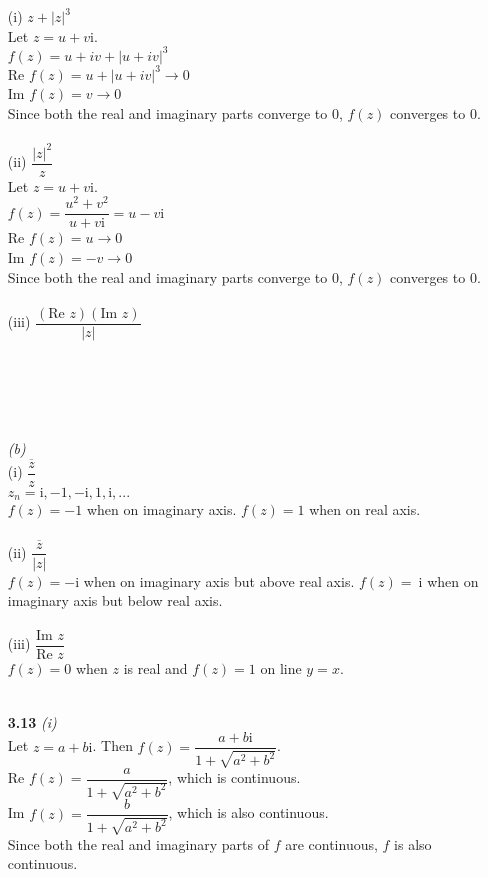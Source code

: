 \begin{enumerate}
(i) $z+|z|^3$ \\
Let $z = u+v\mathrm{i}$. \\
$f(z) = u+iv + |u+iv|^3$ \\
Re $f(z) = u+|u+iv|^3 \rightarrow0$ \\
Im $f(z) = v \rightarrow0$ \\
Since both the real and imaginary parts converge to 0, $f(z)$ converges to 0.
\\\\
(ii) $\dfrac{|z|^2}{z}$ \\
Let $z = u+v\mathrm{i}$. \\
$f(z) = \dfrac{u^2+v^2}{u+v\mathrm{i}} = u-v$i \\
Re $f(z) = u \rightarrow0$ \\
Im $f(z) = -v \rightarrow0$ \\
Since both the real and imaginary parts converge to 0, $f(z)$ converges to 0.
\\\\
(iii) $\dfrac{(\text{Re }z)(\text{Im }z)}{|z|}$ \\\\\\\\\\\\
\textit{(b)} \\
(i) $\dfrac{\overline{z}}{z}$ \\
$z_n = \mathrm{i}, -1, -\mathrm{i}, 1, \mathrm{i}, ...$ \\
$f(z) = -1$ when on imaginary axis.
$f(z) = 1$ when on real axis.
\\\\
(ii) $\dfrac{\overline{z}}{|z|}$ \\
$f(z) = -$i when on imaginary axis but above real axis.
$f(z) = \:$i when on imaginary axis but below real axis.
\\\\
(iii) $\dfrac{\text{Im }z}{\text{Re }z}$ \\
$f(z) = 0$ when $z$ is real and $f(z) = 1$ on line $y=x$.
\\\\
\item[\textbf{3.13}]
\textit{(i)} \\
Let $z = a+b\mathrm{i}$. Then $f(z) = 
\dfrac{a+b\mathrm{i}}{1+\sqrt{a^2+b^2}}$.\\
Re $f(z) = \dfrac{a}{1+\sqrt{a^2+b^2}}$, which is continuous.\\
Im $f(z) = \dfrac{b}{1+\sqrt{a^2+b^2}}$, which is also continuous. \\
Since both the real and imaginary parts of $f$ are continuous, $f$ is also continuous.


\end{enumerate}
